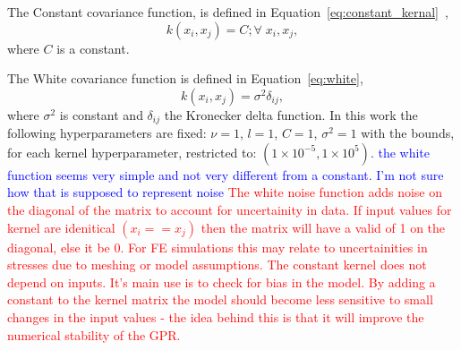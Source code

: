 \documentclass[preprint, review, 12pt]{elsarticle}
\begin{document}
	 The Constant covariance function, is defined in Equation~\ref{eq:constant_kernal}~\cite{PEDREGOSA2011},
	\begin{equation}
		k\left( x_i, x_j \right) = C; \forall \; x_i, x_j,
		\label{eq:constant_kernal}
	\end{equation}
	where $C$ is a constant.

	The White covariance function is defined in Equation~\ref{eq:white},
	\begin{equation}
		k(x_i, x_j) = \sigma^2 \delta_{ij},
		\label{eq:white}
	\end{equation}
 	where $\sigma^2$ is constant and $\delta_{ij}$ the Kronecker delta function.
	In this work the following hyperparameters are fixed: $\nu=1$, $l=1$, $C=1$, $\sigma^2=1$ with the bounds, for each kernel hyperparameter, restricted to: $(1\times10^{-5}, 1\times10^{5})$.
	\textcolor{blue}{the white function seems very simple and not very different from a constant. I'm not sure how that is supposed to represent noise}
	\textcolor{red}{The white noise function adds noise on the diagonal of the matrix to account for uncertainity in data.}
	\textcolor{red}{If input values for kernel are idenitical $(x_i==x_j)$ then the matrix will have a valid of 1 on the diagonal, else it be 0.}
	\textcolor{red}{For FE simulations this may relate to uncertainities in stresses due to meshing or model assumptions.}
	\textcolor{red}{The constant kernel does not depend on inputs.}
	\textcolor{red}{It's main use is to check for bias in the model.}
	\textcolor{red}{By adding a constant to the kernel matrix the model should become less sensitive to small changes in the input values - the idea behind this is that it will improve the numerical stability of the GPR.}
\end{document}
